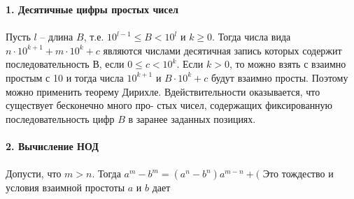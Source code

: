 \documentclass{mai_book}
\begin{document}
\noindent\textbf{1. Десятичные цифры простых чисел}\\
\\
\hspace*{15pt}Пусть $l$ -- длина $B$, т.е. $10^{l-1}\leqslant B <10^l$\: и \:$k\geqslant 0$. Тогда числа вида\linebreak
$n\cdot10^{k+1} + m\cdot10^k + c$ являются числами десятичная запись которых\linebreak
содержит последовательность $В$, если $ 0 \leqslant c < 10^k.$ Если $k > 0$, то\linebreak
можно взять $с$ взаимно простым с 10 и тогда числа $10^{k+1}$ и $B\cdot10^k + c$\linebreak
будут взаимно просты. Поэтому можно применить теорему Дирихле. В\linebreak действительности оказывается, что существует бесконечно много про­-\linebreak
стых чисел, содержащих фиксированную последовательность цифр $B$ в\linebreak
заранее заданных позициях.\\
\\
\noindent\textbf{2. Вычисление НОД}\\
\\
Допусти, что $m>n$. Тогда $a^m - b^m = (a^n-b^n)a^{m-n}+($
Это тождество и условия взаимной простоты $a$ и $b$ дает
\end{document}
